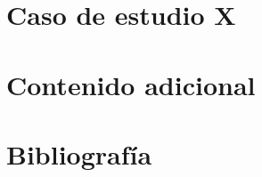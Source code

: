 

\section{Caso de estudio X}





\section{Contenido adicional}




\newpage
\section{Bibliografía}




